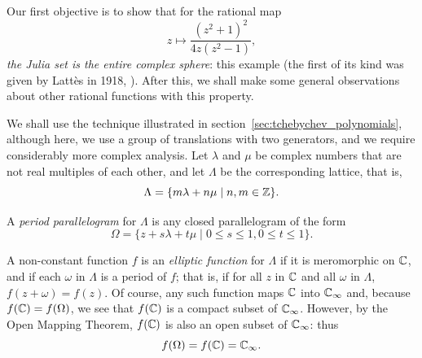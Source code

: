 \begin{example}
    Our first objective is to show that for the rational map
    \begin{equation}
        \label{eq:lattes_function_1}
        z \mapsto \frac{(z^2 + 1)^2}{4z(z^2 - 1)},
    \end{equation}
    \emph{the Julia set is the entire complex sphere}: this example (the first
    of its kind was given by Lattès in 1918, \cite{Lattes1918}). After this, we
    shall make some general observations about other rational functions with
    this property.

    We shall use the technique illustrated in
    section~\ref{sec:tchebychev_polynomials}, although here, we use a group of
    translations with two generators, and we require considerably more complex
    analysis. Let $\lambda$ and $\mu$ be complex numbers that are not real
    multiples of each other, and let $\Lambda$ be the corresponding lattice,
    that is,
    \begin{equation}
        \label{eq:lamdba_mu_lattice}
        \Lambda = \{m\lambda + n\mu \mid n, m \in \mathbb{Z}\}.
    \end{equation}

    A \emph{period parallelogram} for $\Lambda$ is any closed parallelogram of
    the form
    \begin{equation*}
        \Omega = \{z + s\lambda + t\mu \mid 0 \leq s \leq 1, 0 \leq t \leq 1\}.
    \end{equation*}

    A non-constant function $f$ is an \emph{elliptic function} for $\Lambda$ if
    it is meromorphic on $\mathbb{C}$, and if each $\omega$ in $\Lambda$ is a period of
    $f$; that is, if for all $z$ in $\mathbb{C}$ and all $\omega$ in $\Lambda$, $f(z +
    \omega) = f(z)$. Of course, any such function maps $\mathbb{C}$ into $\mathbb{C}_\infty$ and,
    because $f(\mathbb{C}) = f(\Omega)$, we see that $f(\mathbb{C})$ is a compact subset of
    $\mathbb{C}_\infty$. However, by the Open Mapping Theorem, $f(\mathbb{C})$ is also an open
    subset of $\mathbb{C}_\infty$: thus
    \begin{equation*}
        f(\Omega) = f(\mathbb{C}) = \mathbb{C}_\infty.
    \end{equation*}


\end{example}
